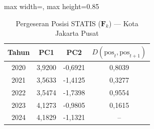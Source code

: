 \begin{table}[H]
\centering
\caption{Pergeseran Posisi STATIS ($\mathbf{F}_k$) --- Kota Jakarta Pusat} \label{tab:app1jarak_statis_skor_kota_jakarta_pusat}
\begin{adjustbox}{max width=\textwidth, max height=0.85\textheight}
\begin{tabular}{|c|c|c|c|}
\hline
\textbf{Tahun} & \textbf{PC1} & \textbf{PC2} & \textbf{$D(\text{pos}_t, \text{pos}_{t+1})$} \\
\hline
2020 & 3,9200 & -0,6921 & 0,8039 \\
2021 & 3,5633 & -1,4125 & 0,3277 \\
2022 & 3,5474 & -1,7398 & 0,9554 \\
2023 & 4,1273 & -0,9805 & 0,1615 \\
2024 & 4,1829 & -1,1321 & -- \\
\hline
\end{tabular}
\end{adjustbox}
\end{table}